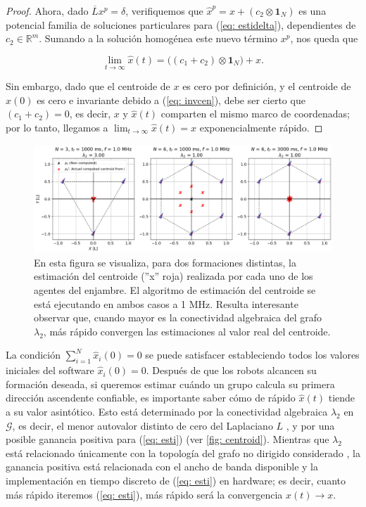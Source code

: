 \begin{proof}
Ahora, dado $\overline Lx^p = \delta$, verifiquemos que $\hat x^p = x + \left(c_2 \otimes \mathbf{1}_N\right)$ es una potencial familia de soluciones particulares para (\ref{eq: estidelta}), dependientes de $c_2\in\mathbb{R}^m$. Sumando a la solución homogénea este nuevo término $x^p$, nos queda que

\begin{equation}
\lim_{t\to\infty}\hat x(t) = \Big((c_1 + c_2) \otimes \mathbf{1}_N\Big) + x. \nonumber
\end{equation}

Sin embargo, dado que el centroide de $x$ es cero por definición, y el centroide de $\hat x(0)$ es cero e invariante debido a (\ref{eq: invcen}), debe ser cierto que $(c_1 + c_2) = 0$, es decir, $x$ y $\hat x(t)$ comparten el mismo marco de coordenadas; por lo tanto, llegamos a $\lim_{t\to\infty}\hat x(t) = x$ exponencialmente rápido.

\end{proof}

\vspace{0.2cm}

\begin{figure}[!h]
\centering
\includegraphics[trim={0cm 0.0cm 0cm 0.0cm}, clip, width=1\columnwidth]{./fig/centroid.png}
\caption{En esta figura se visualiza, para dos formaciones distintas, la estimación del centroide (''x'' roja) realizada por cada uno de los agentes del enjambre. El algoritmo de estimación del centroide se está ejecutando en ambos casos a 1 MHz. Resulta interesante observar que, cuando mayor es la conectividad algebraica del grafo $\lambda_2$, más rápido convergen las estimaciones al valor real del centroide.}
\label{fig: centroid}
\end{figure}

La condición $\sum_{i=1}^N\hat x_i(0) = 0$ se puede satisfacer estableciendo todos los valores iniciales del software $\hat x_i(0) = 0$. Después de que los robots alcancen su formación deseada, si queremos estimar cuándo un grupo calcula su primera dirección ascendente confiable, es importante saber cómo de rápido $\hat x(t)$ tiende a su valor asintótico. Esto está determinado por la conectividad algebraica $\lambda_2$ en $\mathcal{G}$, es decir, el menor autovalor distinto de cero del Laplaciano $L$ \cite{bullo2020lectures}, y por una posible ganancia positiva para (\ref{eq: esti}) (ver \autoref{fig: centroid}). Mientras que $\lambda_2$ está relacionado únicamente con la topología del grafo no dirigido considerado \cite{bullo2020lectures}, la ganancia positiva está relacionada con el ancho de banda disponible y la implementación en tiempo discreto de (\ref{eq: esti}) en hardware; es decir, cuanto más rápido iteremos (\ref{eq: esti}), más rápido será la convergencia $\hat x(t) \to x$.

